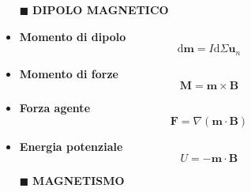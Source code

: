 \documentclass{book}
\newcommand{\g}{\textbf}
\newcommand{\h}{\mathbf}
\newcommand{\e}{\begin{equation}}
\newcommand{\ex}{\end{equation} }
\renewcommand{\it}{\item[$\cdot$]}
\begin{document}
\begin{multicols*}{4}
\begin{itemize}
\item [$\blacksquare$] \g{DIPOLO MAGNETICO}
    \it \g{Momento di dipolo}
        \e{\mathrm{d}\h{m}=I\mathrm{d}\Sigma\h{u}_n} \ex
    \it \g{Momento di forze}
        \e{\h{M}=\h{m}\times\h{B}} \ex
    \it \g{Forza agente}
        \e{\h{F}=\nabla(\h{m}\cdot\h{B})} \ex
    \it \g{Energia potenziale}
        \e{U=-\h{m}\cdot\h{B}} \ex

\item [$\blacksquare$] \g{MAGNETISMO}
    




        

        
        


    
        
    
        

        

        


\end{itemize}

\end{multicols*}
\end{document}
